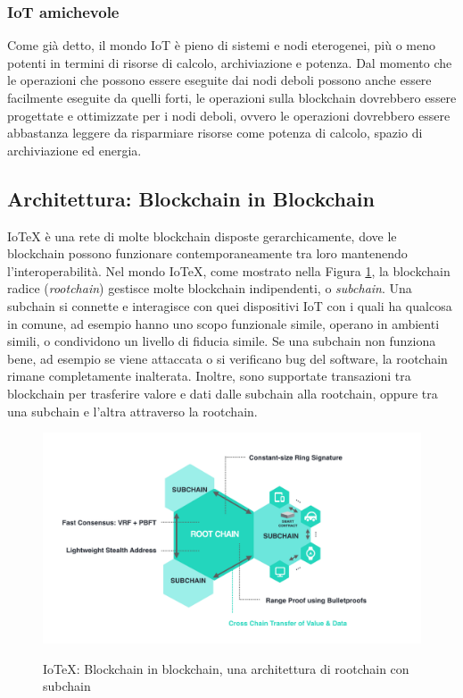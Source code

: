 \subsubsection{IoT amichevole}
Come già detto, il mondo IoT è pieno di sistemi e nodi eterogenei, più o meno potenti in termini di risorse di calcolo, archiviazione e potenza. Dal momento che le operazioni che possono essere eseguite dai nodi deboli possono anche essere facilmente eseguite da quelli forti, le operazioni sulla blockchain dovrebbero essere progettate e ottimizzate per i nodi deboli, ovvero le operazioni dovrebbero essere abbastanza leggere da risparmiare risorse come potenza di calcolo, spazio di archiviazione ed energia.


\subsection{Architettura: Blockchain in Blockchain}
IoTeX è una rete di molte blockchain disposte gerarchicamente, dove le blockchain possono funzionare contemporaneamente tra loro mantenendo l'interoperabilità. Nel mondo IoTeX, come mostrato nella Figura \ref{fig:fig1}, la blockchain radice (\emph{rootchain}) gestisce molte blockchain indipendenti, o \emph{subchain}. Una subchain si connette e interagisce con quei dispositivi IoT con i quali ha qualcosa in comune, ad esempio hanno uno scopo funzionale simile, operano in
ambienti simili, o condividono un livello di fiducia simile. Se una subchain non funziona bene, ad esempio se viene attaccata o si verificano bug del software, la rootchain rimane completamente inalterata. Inoltre, sono supportate transazioni tra blockchain per trasferire valore e dati dalle subchain alla rootchain, oppure tra una subchain e l'altra attraverso la rootchain.

\begin{figure}[ht]
	\includegraphics[width=\textwidth]{Figura1.png}
	\label{fig:fig1}
	\caption{IoTeX: Blockchain in blockchain, una architettura di rootchain con subchain}
\end{figure}

